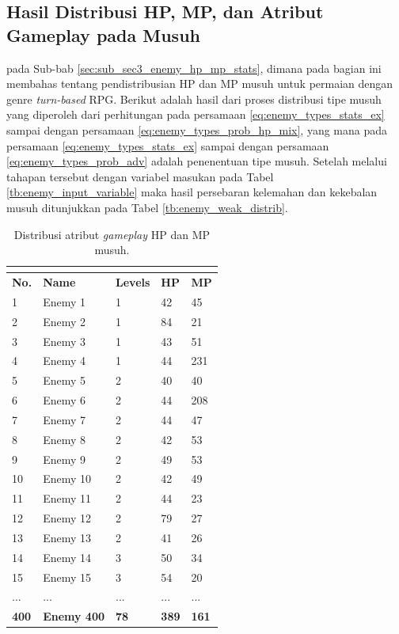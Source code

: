 \subsection{Hasil Distribusi HP, MP, dan Atribut Gameplay pada Musuh}
\label{sec:sub_sec4_eval_dist_enemy_HP_MP_Stats}
\vspace{1ex}

pada Sub-bab \ref{sec:sub_sec3_enemy_hp_mp_stats}, dimana pada bagian ini membahas tentang pendistribusian HP dan MP musuh untuk permaian dengan genre \textit{turn-based} RPG. Berikut adalah hasil dari proses distribusi tipe musuh yang diperoleh dari perhitungan pada persamaan \ref{eq:enemy_types_stats_ex} sampai dengan persamaan \ref{eq:enemy_types_prob_hp_mix}, yang mana pada persamaan \ref{eq:enemy_types_stats_ex} sampai dengan persamaan \ref{eq:enemy_types_prob_adv} adalah penenentuan tipe musuh. Setelah melalui tahapan tersebut dengan variabel masukan pada Tabel \ref{tb:enemy_input_variable} maka hasil persebaran kelemahan dan kekebalan musuh ditunjukkan pada Tabel \ref{tb:enemy_weak_distrib}.
\vspace{-1ex}

\begin{longtable}{|l|l|l|l|l|}
	\caption{Distribusi atribut \textit{gameplay} HP dan MP musuh.}
	\vspace{1ex}
	\label{tb:enemy_weak_stats}\\
	\hline
	\rowcolor[HTML]{C0C0C0} 
	\textbf{No.} & \textbf{Name} & \textbf{Levels} & \textbf{HP} & \textbf{MP} \\ \hline
	1 & Enemy 1 & 1 & 42 & 45 \\ \hline
	2 & Enemy 2 & 1 & 84 & 21 \\ \hline
	3 & Enemy 3 & 1 & 43 & 51 \\ \hline
	4 & Enemy 4 & 1 & 44 & 231 \\ \hline
	5 & Enemy 5 & 2 & 40 & 40 \\ \hline
	6 & Enemy 6 & 2 & 44 & 208 \\ \hline
	7 & Enemy 7 & 2 & 44 & 47 \\ \hline
	8 & Enemy 8 & 2 & 42 & 53 \\ \hline
	9 & Enemy 9 & 2 & 49 & 53 \\ \hline
	10 & Enemy 10 & 2 & 42 & 49 \\ \hline
	11 & Enemy 11 & 2 & 44 & 23 \\ \hline
	12 & Enemy 12 & 2 & 79 & 27 \\ \hline
	13 & Enemy 13 & 2 & 41 & 26 \\ \hline
	14 & Enemy 14 & 3 & 50 & 34 \\ \hline
	15 & Enemy 15 & 3 & 54 & 20 \\ \hline
	... & ... & ... & ... & ... \\ \hline
	\textbf{400} & \textbf{Enemy 400} & \textbf{78} & \textbf{389} & \textbf{161} \\ \hline
\end{longtable}
\vspace{1ex}

